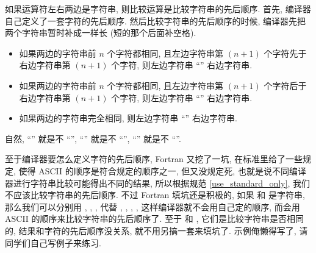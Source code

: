 如果运算符左右两边是字符串, 则比较运算是比较字符串的先后顺序. 首先, 编译器自己定义了一套字符的先后顺序. 然后比较字符串的先后顺序的时候, 编译器先把两个字符串暂时补成一样长 (短的那个后面补空格).
\begin{itemize}
    \item 如果两边的字符串前 $n$ 个字符都相同, 且左边字符串第 $(n+1)$ 个字符先于右边字符串第 $(n+1)$ 个字符, 则左边字符串 ``\ttt{<}'' 右边字符串.
    \item 如果两边的字符串前 $n$ 个字符都相同, 且左边字符串第 $(n+1)$ 个字符后于右边字符串第 $(n+1)$ 个字符, 则左边字符串 ``\ttt{>}'' 右边字符串.
    \item 如果两边的字符串完全相同, 则左边字符串 ``\ttt{==}'' 右边字符串.
\end{itemize}
自然, ``\ttt{>=}'' 就是不 ``\ttt{<}'', ``\ttt{<=}'' 就是不 ``\ttt{>}'', ``\ttt{/=}'' 就是不 ``\ttt{==}''.

至于编译器要怎么定义字符的先后顺序, Fortran 又挖了一坑, 在标准里给了一些规定, 使得 ASCII 的顺序是符合规定的顺序之一, 但又没规定死, 也就是说不同编译器进行字符串比较可能得出不同的结果, 所以根据规范 \ref{use_standard_only}, 我们不应该比较字符串的先后顺序. 不过 Fortran 填坑还是积极的, 如果 \ttt{[a]} 和 \ttt{[b]} 是字符串, 那么我们可以分别用 , , ,  代替 \ttt{[a] >= [b]}, \ttt{[a] > [b]}, \ttt{[a] <= [b]}, \ttt{[a] < [b]}, 这样编译器就不会用自己定的顺序, 而会用 ASCII 的顺序来比较字符串的先后顺序了. 至于 \ttt{[a] == [b]} 和 \ttt{[a] != [b]}, 它们是比较字符串是否相同的, 结果和字符的先后顺序没关系, 就不用另搞一套来填坑了. 示例俺懒得写了, 请同学们自己写例子来练习.
